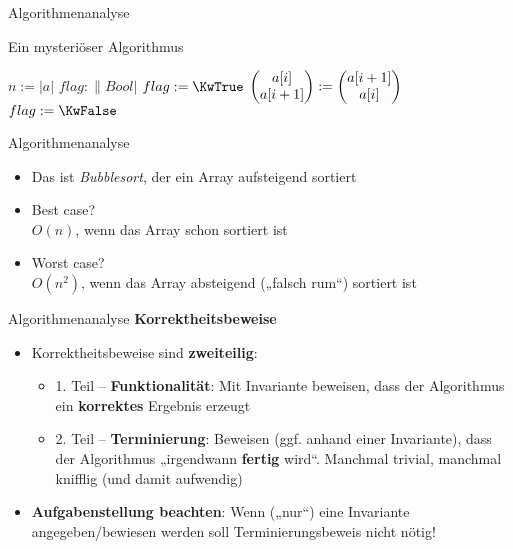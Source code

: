 \begin{frame}{Algorithmenanalyse}
	\begin{exampleblock}{Ein mysteriöser Algorithmus}
		\begin{algorithm}[H]
			 {
				$n := |a|$\;
				$flag : \|Bool|$\;
				 {
					$flag := \KwTrue$\;
					 {
						 {
							$\begin{pmatrix} a[i] \\ a[i+1] \end{pmatrix} := \begin{pmatrix} a[i+1] \\ a[i] \end{pmatrix}$ \; 
							$flag := \KwFalse$\;
						}
					}
				}
			}
		\end{algorithm}
	\end{exampleblock}
\end{frame}


\begin{frame}{Algorithmenanalyse}
	\begin{itemize}
		\item Das ist \textit{Bubblesort}, der ein Array aufsteigend sortiert
		\pause
		\item Best case?
		\pause
		\\ \impl $O(n)$, wenn das Array schon sortiert ist
		\pause
		\item Worst case?
		\pause
		\\ \impl $O(n^2)$, wenn das Array absteigend („falsch rum“) sortiert ist
	\end{itemize}
\end{frame}

\begin{frame}{Algorithmenanalyse}
	\textbf{Korrektheitsbeweise} \\
	\pause
	\begin{itemize}
		\item Korrektheitsbeweise sind \textbf{zweiteilig}:
		\pause
		\begin{itemize}
			\item 1. Teil -- \textbf{Funktionalität}: Mit Invariante beweisen, dass der Algorithmus ein \textbf{korrektes} Ergebnis erzeugt
			\pause
			\item 2. Teil -- \textbf{Terminierung}: Beweisen (ggf. anhand einer Invariante), dass der Algorithmus „irgendwann \textbf{fertig} wird“. Manchmal trivial, manchmal knifflig (und damit aufwendig)
		\end{itemize}
		\pause
		\item \textbf{Aufgabenstellung beachten}: Wenn („nur“) eine Invariante angegeben/bewiesen werden soll \impl Terminierungsbeweis nicht nötig!
	\end{itemize}
\end{frame}

